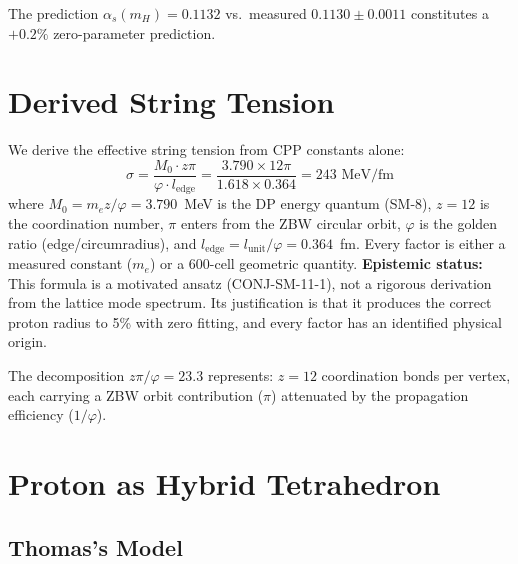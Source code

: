 \documentclass[12pt,a4paper]{article}
\begin{document}
The prediction $\alpha_s(m_H) = 0.1132$ vs.\ measured $0.1130 \pm 0.0011$ constitutes a $+0.2\%$ zero-parameter prediction.

\section{Derived String Tension}
\label{sec:sigma}

We derive the effective string tension from CPP constants alone:
\begin{equation}
\boxed{\sigma = \frac{M_0 \cdot z\pi}{\varphi \cdot l_{\mathrm{edge}}} = \frac{3.790 \times 12\pi}{1.618 \times 0.364} = 243 \text{ MeV/fm}}
\label{eq:sigma}
\end{equation}
where $M_0 = m_e z/\varphi = 3.790$~MeV is the DP energy quantum (SM-8), $z = 12$ is the coordination number, $\pi$ enters from the ZBW circular orbit, $\varphi$ is the golden ratio (edge/circumradius), and $l_{\mathrm{edge}} = l_{\mathrm{unit}}/\varphi = 0.364$~fm. Every factor is either a measured constant ($m_e$) or a 600-cell geometric quantity. \textbf{Epistemic status:} This formula is a motivated ansatz (CONJ-SM-11-1), not a rigorous derivation from the lattice mode spectrum. Its justification is that it produces the correct proton radius to 5\% with zero fitting, and every factor has an identified physical origin.

The decomposition $z\pi/\varphi = 23.3$ represents: $z = 12$ coordination bonds per vertex, each carrying a ZBW orbit contribution ($\pi$) attenuated by the propagation efficiency ($1/\varphi$).

\section{Proton as Hybrid Tetrahedron}
\label{sec:proton}

\subsection{Thomas's Model}
\end{document}
